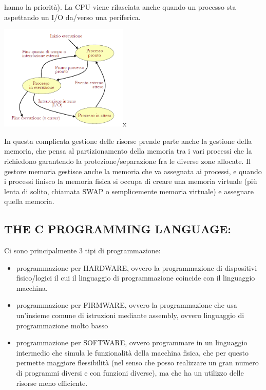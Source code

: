 \documentclass[
  paper=a4,
  oneside  ,captions=tableheading
]{scrbook}
\providecommand{\tightlist}{%
  \setlength{\itemsep}{0pt}\setlength{\parskip}{0pt}}
\begin{document}
hanno la priorità). La CPU viene rilasciata anche quando un processo sta
aspettando un I/O da/verso una periferica.
\begin{center}
\includegraphics[height=5cm]{./image/image-20201123235406308.png}x
\end{center}
In questa complicata gestione delle risorse prende parte anche la
gestione della memoria, che pensa al partizionamento della memoria tra i
vari processi che la richiedono garantendo la protezione/separazione fra
le diverse zone allocate. Il gestore memoria gestisce anche la memoria
che va assegnata ai processi, e quando i processi finisco la memoria
fisica si occupa di creare una memoria virtuale (più lenta di solito,
chiamata SWAP o semplicemente memoria virtuale) e assegnare quella
memoria.

\hypertarget{the-c-programming-language}{%
\subsection{THE C PROGRAMMING
LANGUAGE:}\label{the-c-programming-language}}

Ci sono principalmente 3 tipi di programmazione:

\begin{itemize}
\tightlist
\item
  programmazione per HARDWARE, ovvero la programmazione di dispositivi
  fisico/logici il cui il linguaggio di programmazione coincide con il
  linguaggio macchina.
\item
  programmazione per FIRMWARE, ovvero la programmazione che usa
  un'insieme comune di istruzioni mediante assembly, ovvero linguaggio
  di programmazione molto basso
\item
  programmazione per SOFTWARE, ovvero programmare in un linguaggio
  intermedio che simula le funzionalità della macchina fisica, che per
  questo permette maggiore flessibilità (nel senso che posso realizzare
  un gran numero di programmi diversi e con funzioni diverse), ma che ha
  un utilizzo delle risorse meno efficiente.
\end{itemize}
\end{document}
